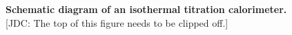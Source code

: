 \documentclass[aps,pre,twocolumn,nofootinbib,superscriptaddress,linenumbers]{revtex4-1}
\begin{document}
\begin{figure} 
\caption{\label{figure:itc-diagram} {\bf Schematic diagram of an isothermal titration calorimeter.} {\color{red} [JDC: The top of this figure needs to be clipped off.]}} 
\end{figure}
\end{document}
